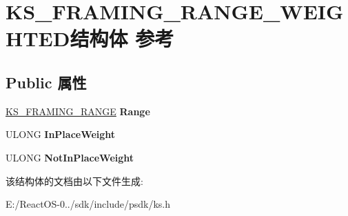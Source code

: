 \hypertarget{struct_k_s___f_r_a_m_i_n_g___r_a_n_g_e___w_e_i_g_h_t_e_d}{}\section{K\+S\+\_\+\+F\+R\+A\+M\+I\+N\+G\+\_\+\+R\+A\+N\+G\+E\+\_\+\+W\+E\+I\+G\+H\+T\+E\+D结构体 参考}
\label{struct_k_s___f_r_a_m_i_n_g___r_a_n_g_e___w_e_i_g_h_t_e_d}
\subsection*{Public 属性}
\begin{DoxyCompactItemize}
\item 
\mbox{\label{struct_k_s___f_r_a_m_i_n_g___r_a_n_g_e___w_e_i_g_h_t_e_d_a55d3e79af39381b05c100b5627cf31eb}} 
\hyperlink{struct_k_s___f_r_a_m_i_n_g___r_a_n_g_e}{K\+S\+\_\+\+F\+R\+A\+M\+I\+N\+G\+\_\+\+R\+A\+N\+GE} {\bfseries Range}
\item 
\mbox{\label{struct_k_s___f_r_a_m_i_n_g___r_a_n_g_e___w_e_i_g_h_t_e_d_ad4a6c1ca2a0c4d359227df608943fbce}} 
U\+L\+O\+NG {\bfseries In\+Place\+Weight}
\item 
\mbox{\label{struct_k_s___f_r_a_m_i_n_g___r_a_n_g_e___w_e_i_g_h_t_e_d_af23bb8f865862ffe083460cc17c91589}} 
U\+L\+O\+NG {\bfseries Not\+In\+Place\+Weight}
\end{DoxyCompactItemize}


该结构体的文档由以下文件生成\+:\begin{DoxyCompactItemize}
\item 
E\+:/\+React\+O\+S-\/0../sdk/include/psdk/ks.\+h\end{DoxyCompactItemize}

